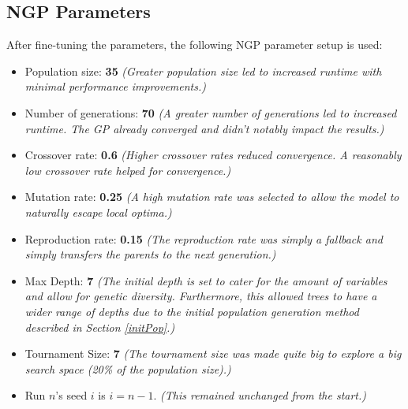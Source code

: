 \documentclass{article}
\begin{document}
\subsection{NGP Parameters}
After fine-tuning the parameters, the following NGP parameter setup is used:
\begin{itemize}
  \item Population size: \textbf{35} \emph{(Greater population size led to increased runtime with minimal performance improvements.)}
  \item Number of generations: \textbf{70} \emph{(A greater number of generations led to increased runtime. The GP already converged and didn't notably impact the results.)}
  \item Crossover rate: \textbf{0.6} \emph{(Higher crossover rates reduced convergence. A reasonably low crossover rate helped for convergence.)}
  \item Mutation rate: \textbf{0.25} \emph{(A high mutation rate was selected to allow the model to naturally escape local optima.)}
  \item Reproduction rate: \textbf{0.15} \emph{(The reproduction rate was simply a fallback and simply transfers the parents to the next generation.)}
  \item Max Depth: \textbf{7} \emph{(The initial depth is set to cater for the amount of variables and allow for genetic diversity. Furthermore, this allowed trees to have a wider range of depths due to the initial population generation method described in Section \ref{initPop}.)} 
  \item Tournament Size: \textbf{7} \emph{(The tournament size was made quite big to explore a big search space (20\% of the population size).)}
  \item Run \(n\)'s seed \(i\) is \(i = n-1\). \emph{(This remained unchanged from the start.)}
\end{itemize}
\end{document}

